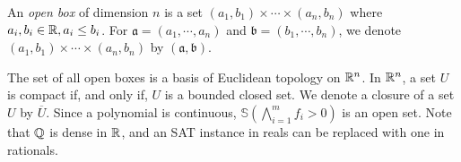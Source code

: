 
\begin{definition}
An \emph{open box} of dimension $n$ is a set $(a_1,b_1) \times \cdots \times (a_n,b_n)$ 
where $a_i, b_i \in {\mathbb R}, a_i \leq b_i$.  
For $\mathfrak{a} = (a_1, \cdots, a_n)$ and $\mathfrak{b} = (b_1, \cdots, b_n)$, 
we denote $(a_1,b_1) \times \cdots \times (a_n,b_n)$ by $(\mathfrak{a}, \mathfrak{b})$. 
\end{definition}

The set of all open boxes is a basis of Euclidean topology on ${\mathbb R}^n$. 
In ${\mathbb R}^n$, a set $U$ is compact if, and only if, $U$ is a bounded closed set. 
We denote a closure of a set $U$ by $\overline{U}$. 
%
Since a polynomial is continuous, 
$\mathbb{S}(\bigwedge \limits_{i=1}^m f_i > 0)$ is an open set. 
Note that ${\mathbb Q}$ is dense in ${\mathbb R}$, and an SAT instance in reals can be replaced with one in rationals. 

